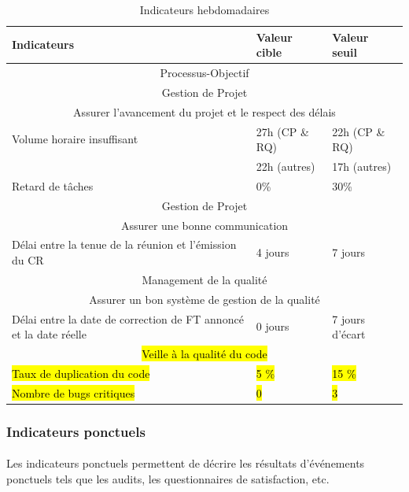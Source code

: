 \begin{table}[H]

\begin{tabular}[h]{|p{}|p{}|p{}|}
	\hline
	\rowcolor[gray]{0.85}
	Indicateurs & Valeur cible & Valeur seuil \\\hline
	\multicolumn{3}{|c|}{Processus-Objectif} \\\hline
	\multicolumn{3}{|c|}{\cellcolor[gray]{0.85} Gestion de Projet} \\
	\multicolumn{3}{|c|}{\cellcolor[gray]{0.85} Assurer l'avancement du projet et le respect des délais} \\\hline
	Volume horaire insuffisant & 27h (CP \& RQ) & 22h (CP \& RQ)  \\
	 & 22h (autres) & 17h (autres)  \\\hline
	Retard de tâches & 0\% & 30\% \\\hline
	\multicolumn{3}{|c|}{\cellcolor[gray]{0.85} Gestion de Projet} \\
	\multicolumn{3}{|c|}{\cellcolor[gray]{0.85} Assurer une bonne communication} \\\hline
	Délai entre la tenue de la réunion et l'émission du CR & 4 jours & 7 jours \\\hline
	\multicolumn{3}{|c|}{\cellcolor[gray]{0.85} Management de la qualité} \\
	\multicolumn{3}{|c|}{\cellcolor[gray]{0.85} Assurer un bon système de gestion de la qualité} \\\hline
	Délai entre la date de correction de FT annoncé et la date réelle & 0 jours & 7 jours d'écart \\\hline
	\multicolumn{3}{|c|}{\cellcolor[gray]{0.85} \hl{Veille à la qualité du code}} \\
	\hl{Taux de duplication du code} & \hl{5 \%} & \hl{15 \%} \\\hline
	\hl{Nombre de bugs critiques} & \hl{0} & \hl{3} \\\hline
	
\end{tabular}
\caption{Indicateurs hebdomadaires} \label{Tableau 6.1}
\end{table}


\subsubsection*{Indicateurs ponctuels}
\label{Indicateurs ponctuels}
\paragraph*{} Les indicateurs ponctuels permettent de décrire les résultats d’événements ponctuels tels que les audits, les questionnaires de satisfaction, etc.

